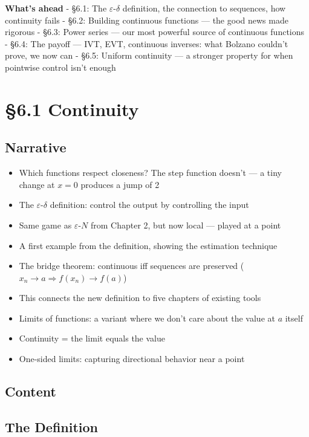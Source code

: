 \documentclass[
  10pt,
  letterpaper,
]{scrbook}
\providecommand{\tightlist}{%
  \setlength{\itemsep}{0pt}\setlength{\parskip}{0pt}}
\begin{document}
\textbf{What's ahead} - §6.1: The \(\varepsilon\)-\(\delta\) definition,
the connection to sequences, how continuity fails - §6.2: Building
continuous functions --- the good news made rigorous - §6.3: Power
series --- our most powerful source of continuous functions - §6.4: The
payoff --- IVT, EVT, continuous inverses: what Bolzano couldn't prove,
we now can - §6.5: Uniform continuity --- a stronger property for when
pointwise control isn't enough

\section{§6.1 Continuity}\label{continuity-1}

\subsection{Narrative}\label{narrative-24}

\begin{itemize}
\tightlist
\item
  Which functions respect closeness? The step function doesn't --- a
  tiny change at \(x = 0\) produces a jump of 2
\item
  The \(\varepsilon\)-\(\delta\) definition: control the output by
  controlling the input
\item
  Same game as \(\varepsilon\)-\(N\) from Chapter 2, but now local ---
  played at a point
\item
  A first example from the definition, showing the estimation technique
\item
  The bridge theorem: continuous iff sequences are preserved
  (\(x_n \to a \Rightarrow f(x_n) \to f(a)\))
\item
  This connects the new definition to five chapters of existing tools
\item
  Limits of functions: a variant where we don't care about the value at
  \(a\) itself
\item
  Continuity = the limit equals the value
\item
  One-sided limits: capturing directional behavior near a point
\end{itemize}

\subsection{Content}\label{content-24}

\subsection{The Definition}\label{the-definition-1}
\end{document}
